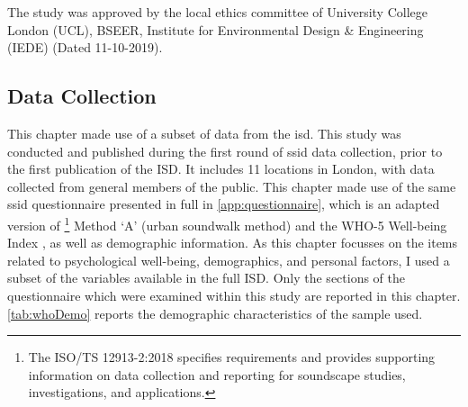 The study was approved by the local ethics committee of University College London (UCL), BSEER, Institute for Environmental Design \& Engineering (IEDE) (Dated 11-10-2019).

\subsection{Data Collection}
This chapter made use of a subset of data from the \gls{isd}. This study was conducted and published during the first round of \gls{ssid} data collection, prior to the first publication of the ISD. It includes 11 locations in London, with data collected from general members of the public. This chapter made use of the same \gls{ssid} questionnaire presented in full in \cref{app:questionnaire}, which is an adapted version of \citet{ISO12913Part2}\footnote{The ISO/TS 12913-2:2018 specifies requirements and provides supporting information on data collection and reporting for soundscape studies, investigations, and applications.} Method `A' (urban soundwalk method) and the WHO-5 Well-being Index \citep{Hall2011Examining}, as well as demographic information. As this chapter focusses on the items related to psychological well-being, demographics, and personal factors, I used a subset of the variables available in the full ISD. Only the sections of the questionnaire which were examined within this study are reported in this chapter. \cref{tab:whoDemo} reports the demographic characteristics of the sample used.


